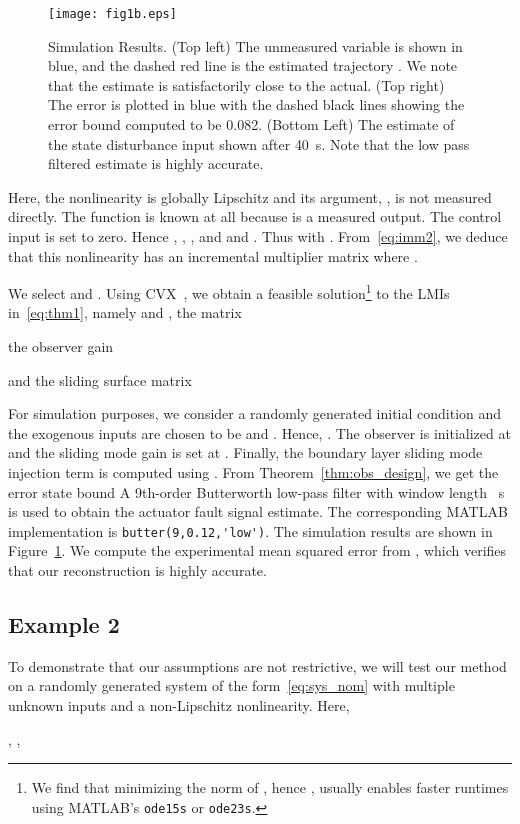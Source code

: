 \documentclass[times, doublespace]{rncauth}
\begin{document}
\begin{figure}[!ht]
	\centering
	\texttt{[image: fig1b.eps]}
	\caption{Simulation Results. (Top left) The unmeasured variable  is shown in blue, and the dashed red line is the estimated trajectory . We note that the estimate is satisfactorily close to the actual. (Top right) The error  is plotted in blue with the dashed black lines showing the error bound computed to be 0.082. (Bottom Left) The estimate of the state disturbance input  shown after 40~s. Note that the low pass filtered estimate is highly accurate. }
	\label{fig:ex1}
\end{figure}
Here, the nonlinearity  is globally Lipschitz and its argument, , is not measured directly. The function  is known at all  because  is a measured output. The control input is set to zero.
Hence , , ,  and  and . Thus  with . From~\eqref{eq:imm2}, we deduce that this nonlinearity has an incremental multiplier matrix  where .

We select  and . Using CVX~\cite{cvx}, we obtain a feasible solution\footnote{We find that minimizing the norm of , hence , usually enables faster runtimes using MATLAB's \texttt{ode15s} or \texttt{ode23s}.} to the LMIs in~\eqref{eq:thm1}, namely  and , the matrix

the observer gain

and the sliding surface matrix

For simulation purposes, we consider a randomly generated initial condition  and the exogenous inputs are chosen to be  and . Hence, . The observer is initialized at  and the sliding mode gain is set at . Finally, the boundary layer sliding mode injection term  is computed using . From Theorem~\ref{thm:obs_design}, we get the error state bound
 A 9th-order Butterworth low-pass filter with window length ~s is used to obtain the actuator fault signal estimate. The corresponding MATLAB implementation is \verb|butter(9,0.12,'low')|. The simulation results are shown in Figure~\ref{fig:ex1}. We compute the experimental mean squared error  from , which verifies that our reconstruction is highly accurate.
\subsection{Example 2}
To demonstrate that our assumptions are not restrictive, we will test our method on a randomly generated system of the form~\eqref{eq:sys_nom} with multiple unknown inputs and a non-Lipschitz nonlinearity. Here,

, ,
\end{document}
